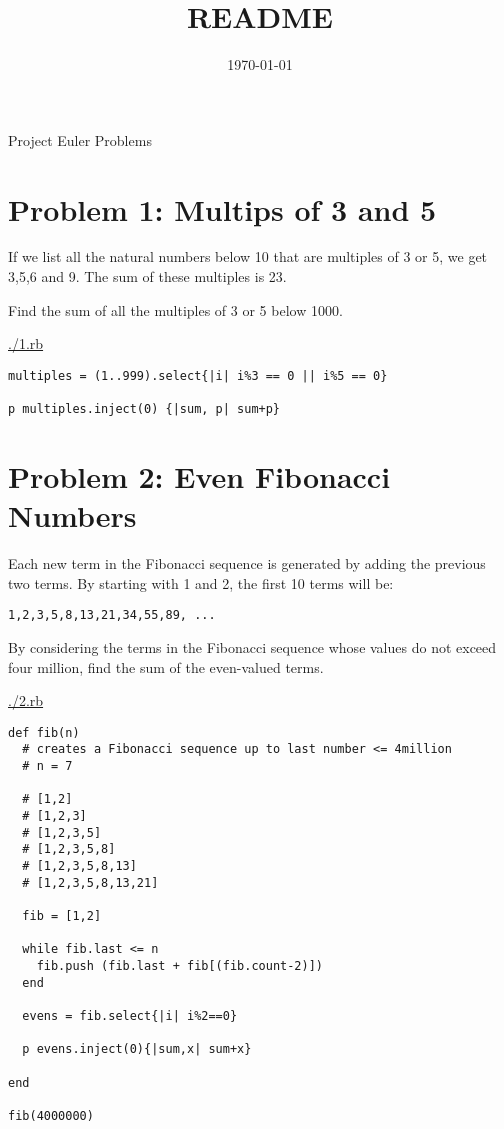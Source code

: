\documentclass[11pt]{article}
\date{\today}
\title{README}
\begin{document}
\maketitle
\tableofcontents

Project Euler Problems

\section{Problem 1: Multips of 3 and 5}
\label{sec-1}

If we list all the natural numbers below 10 that are multiples of 3 or 5, we 
get 3,5,6 and 9. The sum of these multiples is 23.

Find the sum of all the multiples of 3 or 5 below 1000.

\url{./1.rb}

\begin{verbatim}
multiples = (1..999).select{|i| i%3 == 0 || i%5 == 0}

p multiples.inject(0) {|sum, p| sum+p}
\end{verbatim}



\section{Problem 2: Even Fibonacci Numbers}
\label{sec-2}

Each new term in the Fibonacci sequence is generated by adding the previous 
two terms. By starting with 1 and 2, the first 10 terms will be:

\begin{verbatim}
1,2,3,5,8,13,21,34,55,89, ...
\end{verbatim}

By considering the terms in the Fibonacci sequence whose values do not exceed 
four million, find the sum of the even-valued terms.

\url{./2.rb}

\begin{verbatim}
def fib(n)
  # creates a Fibonacci sequence up to last number <= 4million
  # n = 7

  # [1,2]
  # [1,2,3]
  # [1,2,3,5]
  # [1,2,3,5,8]
  # [1,2,3,5,8,13]
  # [1,2,3,5,8,13,21]

  fib = [1,2]

  while fib.last <= n
    fib.push (fib.last + fib[(fib.count-2)])
  end

  evens = fib.select{|i| i%2==0}

  p evens.inject(0){|sum,x| sum+x}

end

fib(4000000)
\end{verbatim}
\end{document}
